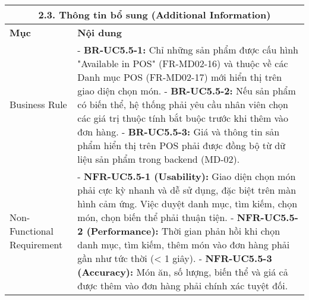 \begin{longtable}{|m{4cm}|p{11cm}|}
\hline
\multicolumn{2}{|c|}{\textbf{2.3. Thông tin bổ sung (Additional Information)}} \\
\hline
\textbf{Mục} & \textbf{Nội dung} \\
\hline
Business Rule & - \textbf{BR-UC5.5-1:} Chỉ những sản phẩm được cấu hình "Available in POS" (FR-MD02-16) và thuộc về các Danh mục POS (FR-MD02-17) mới hiển thị trên giao diện chọn món. \newline - \textbf{BR-UC5.5-2:} Nếu sản phẩm có biến thể, hệ thống phải yêu cầu nhân viên chọn các giá trị thuộc tính bắt buộc trước khi thêm vào đơn hàng. \newline - \textbf{BR-UC5.5-3:} Giá và thông tin sản phẩm hiển thị trên POS phải được đồng bộ từ dữ liệu sản phẩm trong backend (MD-02). \\
\hline
Non-Functional Requirement & - \textbf{NFR-UC5.5-1 (Usability):} Giao diện chọn món phải cực kỳ nhanh và dễ sử dụng, đặc biệt trên màn hình cảm ứng. Việc duyệt danh mục, tìm kiếm, chọn món, chọn biến thể phải thuận tiện. \newline - \textbf{NFR-UC5.5-2 (Performance):} Thời gian phản hồi khi chọn danh mục, tìm kiếm, thêm món vào đơn hàng phải gần như tức thời (< 1 giây). \newline - \textbf{NFR-UC5.5-3 (Accuracy):} Món ăn, số lượng, biến thể và giá cả được thêm vào đơn hàng phải chính xác tuyệt đối. \\
\hline
\end{longtable}

